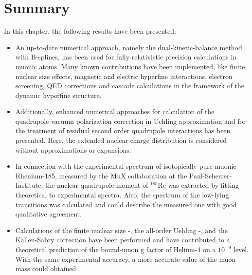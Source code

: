 \section{Summary}
\label{sec:muon_summary}
In this chapter, the following results have been presented:
\begin{itemize}
\item An up-to-date numerical approach, namely the dual-kinetic-balance method with B-splines, has been used for fully relativistic precision calculations in muonic atoms. Many known contributions have been implemented, like finite nuclear size effects, magnetic and electric hyperfine interactions, electron screening, QED corrections and cascade calculations in the framework of the dynamic hyperfine structure.
\item Additionally, enhanced numerical approaches for calculation of the quadrupole vacuum polarization correction in Uehling approximation and for the treatment of residual second order quadrupole interactions has been presented. Here, the extended nuclear charge distribution is considered without approximations or expansions.
\item In connection with the experimental spectrum of isotopically pure muonic Rhenium-185, measured by the MuX collaboration at the Paul-Scherrer-Institute, the nuclear quadrupole moment of $^{185}$Re was extracted by fitting theoretical to experimental spectra. Also, the spectrum of the low-lying transitions was calculated and could describe the measured one with good qualitative agreement.
\item Calculations of the finite nuclear size -, the all-order Uehling -, and the Källen-Sabry correction have been performed and have contributed to a theoretical prediction of the bound-muon g factor of Helium-4 on a $10^{-9}$ level. With the same experimental accuracy, a more accurate value of the muon mass could obtained.
\end{itemize}
